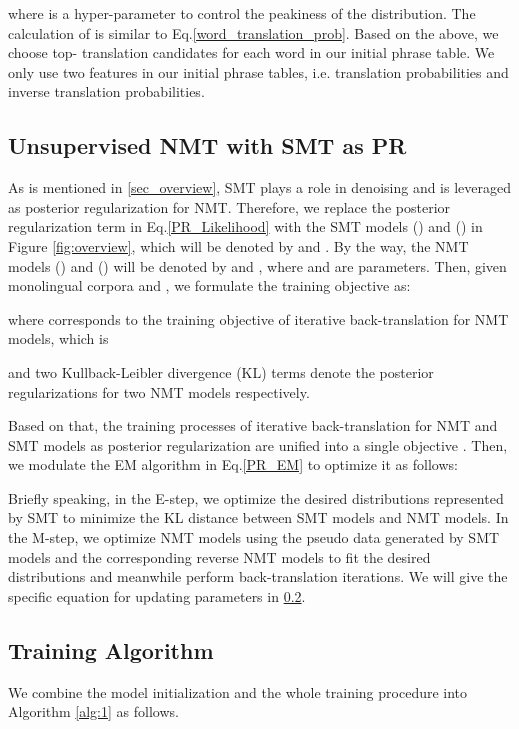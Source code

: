 \documentclass[letterpaper]{article} \usepackage{aaai19}  \usepackage{times}  \usepackage{helvet}  \usepackage{courier}  \usepackage{url}  \usepackage{graphicx}  \usepackage{amsmath}
\newcommand{\newref}[1]{Eq.\eqref{#1}}
\begin{document}
where  is a hyper-parameter to control the peakiness of the distribution. The calculation of  is similar to \newref{word_translation_prob}. Based on the above, we choose top- translation candidates for each word in our initial phrase table. We only use two features in our initial phrase tables, i.e. translation probabilities and inverse translation probabilities.


\subsection{Unsupervised NMT with SMT as PR}
\label{sec_objective}
As is mentioned in \ref{sec_overview}, SMT plays a role in denoising and is leveraged as posterior regularization for NMT. Therefore, we replace the posterior regularization term  in \newref{PR_Likelihood} with the SMT models () and () in Figure \ref{fig:overview}, which will be denoted by  and . 
By the way, the NMT models () and () will be denoted by  and , where  and  are parameters. Then,
given monolingual corpora  and , we formulate the training objective as:


where  corresponds to the training objective of iterative back-translation for NMT models, which is

and two Kullback-Leibler divergence (KL) terms denote the posterior regularizations for two NMT models respectively. 

Based on that, the training processes of iterative back-translation for NMT and SMT models as posterior regularization are unified into a single objective . Then, we modulate the EM algorithm in \newref{PR_EM} to optimize it as follows: 



Briefly speaking, in the E-step, we optimize the desired distributions represented by SMT to minimize the KL distance between SMT models and NMT models. In the M-step, we optimize NMT models using the pseudo data generated by SMT models and the corresponding reverse NMT models to fit the desired distributions and meanwhile perform back-translation iterations. We will give the specific equation for updating parameters in \ref{sec_training}. 

\subsection{Training Algorithm}
\label{sec_training}
We combine the model initialization and the whole training procedure into Algorithm \ref{alg:1} as follows.
\end{document}
